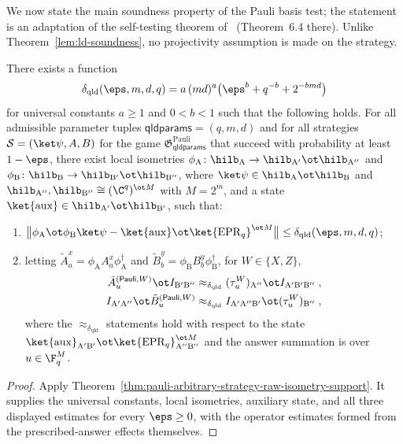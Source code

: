 We now state the main soundness property of the Pauli basis test; the statement is an adaptation of the self-testing theorem of~\cite{Natarajan2018NEEXP} (Theorem~6.4 there). Unlike Theorem~\ref{lem:ld-soundness}, no projectivity assumption is made on the strategy.

\begin{theorem}\label{thm:pauli}
	\leanok
	There exists a function
	\[
		\delta_{\mathrm{qld}}(\eps, m, d, q) = a\,(md)^a \bigl( \eps^b + q^{-b} + 2^{-bmd} \bigr)
	\]
	for universal constants $a \ge 1$ and $0 < b < 1$ such that the following holds. For all admissible parameter tuples $\mathsf{qldparams} = (q,m,d)$ and for all strategies $\mathcal S = (\ket\psi, A, B)$ for the game $\mathfrak{G}^{\mathrm{Pauli}}_{\mathsf{qldparams}}$ that succeed with probability at least $1 - \eps$, there exist local isometries $\phi_{\mathrm A}\colon \hilb_{\mathrm A} \to \hilb_{\mathrm A'} \ot \hilb_{\mathrm A''}$ and $\phi_{\mathrm B}\colon \hilb_{\mathrm B} \to \hilb_{\mathrm B'} \ot \hilb_{\mathrm B''}$, where $\ket\psi \in \hilb_{\mathrm A} \ot \hilb_{\mathrm B}$ and $\hilb_{\mathrm A''}, \hilb_{\mathrm B''} \cong (\C^q)^{\ot M}$ with $M = 2^m$, and a state $\ket{\mathrm{aux}} \in \hilb_{\mathrm A'} \ot \hilb_{\mathrm B'}$, such that:
	\begin{enumerate}
		\item $\bigl\| \phi_{\mathrm A} \ot \phi_{\mathrm B} \ket\psi - \ket{\mathrm{aux}} \ot \ket{\mathrm{EPR}_q}^{\ot M} \bigr\| \le \delta_{\mathrm{qld}}(\eps, m, d, q)$;
		\item letting $\tilde A^x_a = \phi_{\mathrm A} A^x_a \phi_{\mathrm A}^\dagger$ and $\tilde B^y_b = \phi_{\mathrm B} B^y_b \phi_{\mathrm B}^\dagger$, for $W \in \{X, Z\}$,
		\begin{align*}
			\tilde A^{(\mathsf{Pauli},W)}_u \ot I_{\mathrm{B'B''}} &\approx_{\delta_{\mathrm{qld}}} (\tau^W_u)_{\mathrm A''} \ot I_{\mathrm{A'B'B''}}\;,\\
			I_{\mathrm{A'A''}} \ot \tilde B^{(\mathsf{Pauli},W)}_u &\approx_{\delta_{\mathrm{qld}}} I_{\mathrm{A'A''B'}} \ot (\tau^W_u)_{\mathrm B''}\;,
		\end{align*}
		where the $\approx_{\delta_{\mathrm{qld}}}$ statements hold with respect to the state $\ket{\mathrm{aux}}_{\mathrm{A'B'}} \ot \ket{\mathrm{EPR}_q}^{\ot M}_{\mathrm{A''B''}}$ and the answer summation is over $u \in \F_q^M$.
	\end{enumerate}
\end{theorem}
\begin{proof}
	\leanok
	Apply Theorem~\ref{thm:pauli-arbitrary-strategy-raw-isometry-support}. It
	supplies the universal constants, local isometries, auxiliary state, and all
	three displayed estimates for every $\eps\geq0$, with the operator estimates
	formed from the prescribed-answer effects themselves.
\end{proof}

